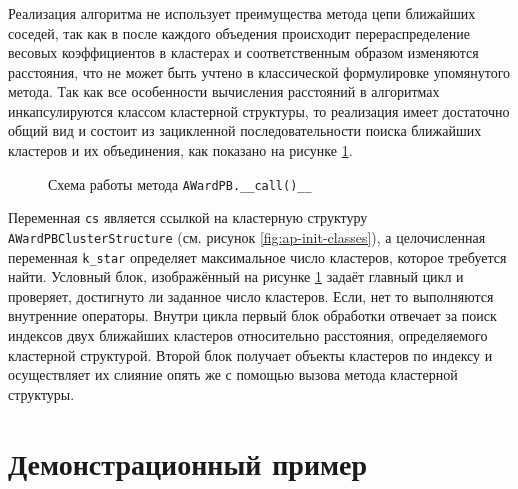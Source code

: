 \documentclass[12pt]{diploma}
\begin{document}
	\subsubsection{\AWardpb}
	Реализация алгоритма \AWardpb не использует преимущества метода цепи ближайших соседей, так как в \AWardpb после каждого объедения происходит перераспределение весовых коэффициентов в кластерах и соответственным образом изменяются расстояния, что не может быть учтено в классической формулировке упомянутого метода. Так как все особенности вычисления расстояний в алгоритмах инкапсулируются классом кластерной структуры, то реализация \AWardpb имеет достаточно общий вид и состоит из зацикленной последовательности поиска ближайших кластеров и их объединения, как показано на рисунке \ref{fig:award-pb-alg}.

	\begin{figure}[h!]
		\centering
		
		\caption{Схема работы метода \texttt{AWardPB.\_\_call()\_\_}}
		\label{fig:award-pb-alg}
	\end{figure}
		
	Переменная \texttt{cs} является ссылкой на кластерную структуру \texttt{AWardPBClusterStructure} (см. рисунок \ref{fig:ap-init-classes}), а целочисленная переменная \texttt{k\_star} определяет максимальное число кластеров, которое требуется найти. Условный блок, изображённый на рисунке  \ref{fig:award-pb-alg} задаёт главный цикл и проверяет, достигнуто ли заданное число кластеров. Если, нет то выполняются внутренние операторы. Внутри цикла первый блок обработки отвечает за поиск индексов двух ближайших кластеров относительно расстояния, определяемого кластерной структурой. Второй блок получает объекты кластеров по индексу и осуществляет их слияние опять же с помощью вызова метода кластерной структуры.
			


	\subsubsection{\dePDDP}
	\subsubsection{\BiKMR}
	
	\newpage
	\section{Демонстрационный пример}
	
\end{document}
